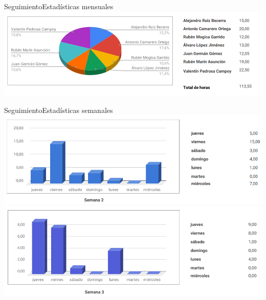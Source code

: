 \documentclass{beamer}
\begin{document}
	\begin{frame}{Seguimiento}{Estad\'isticas mensuales}
	\centering
	\includegraphics[width=0.8\paperwidth]{images_latex/seguimiento/graf_horas_1}
	\end{frame}

	\begin{frame}{Seguimiento}{Estad\'isticas semanales}
	\centering
	\includegraphics[width=0.8\paperwidth]{images_latex/seguimiento/graf_horas_2}
	\includegraphics[width=0.8\paperwidth]{images_latex/seguimiento/graf_horas_3}
	\end{frame}


\end{document}

